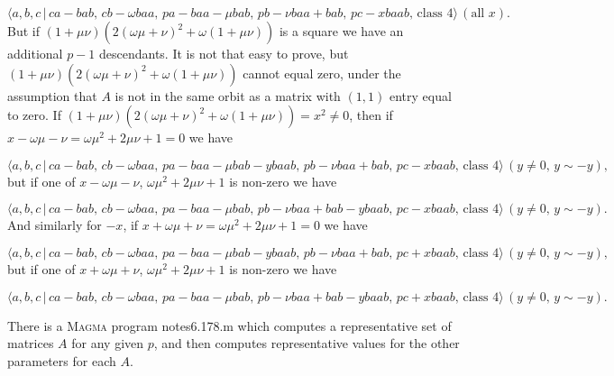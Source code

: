 \documentclass[12pt]{article}
\begin{document}
\[
\langle a,b,c\,|\,ca-bab,\,cb-\omega baa,\,pa-baa-\mu bab,\,pb-\nu
baa+bab,\,pc-xbaab,\,\text{class }4\rangle \,(\text{all }x). 
\]%
But if $\left( 1+\mu \nu \right) \left( 2\left( \omega \mu +\nu \right)
^{2}+\omega (1+\mu \nu )\right) $ is a square we have an additional $p-1$
descendants. It is not that easy to prove, but $\left( 1+\mu \nu \right)
\left( 2\left( \omega \mu +\nu \right) ^{2}+\omega (1+\mu \nu )\right) $
cannot equal zero, under the assumption that $A$ is not in the same orbit as
a matrix with $(1,1)$ entry equal to zero. If $\left( 1+\mu \nu \right)
\left( 2\left( \omega \mu +\nu \right) ^{2}+\omega (1+\mu \nu )\right)
=x^{2}\neq 0$, then if $x-\omega \mu -\nu =\omega \mu ^{2}+2\mu \nu +1=0$ we
have

\[
\langle a,b,c\,|\,ca-bab,\,cb-\omega baa,\,pa-baa-\mu bab-ybaab,\,pb-\nu
baa+bab,\,pc-xbaab,\,\text{class }4\rangle \,(y\neq 0,\,y\sim -y),
\]%
but if one of $x-\omega \mu -\nu $, $\omega \mu ^{2}+2\mu \nu +1$ is
non-zero we have

\[
\langle a,b,c\,|\,ca-bab,\,cb-\omega baa,\,pa-baa-\mu bab,\,pb-\nu
baa+bab-ybaab,\,pc-xbaab,\,\text{class }4\rangle \,(y\neq 0,\,y\sim -y).
\]%
And similarly for $-x$, if $x+\omega \mu +\nu =\omega \mu ^{2}+2\mu \nu +1=0$
we have

\[
\langle a,b,c\,|\,ca-bab,\,cb-\omega baa,\,pa-baa-\mu bab-ybaab,\,pb-\nu
baa+bab,\,pc+xbaab,\,\text{class }4\rangle \,(y\neq 0,\,y\sim -y),
\]%
but if one of $x+\omega \mu +\nu $, $\omega \mu ^{2}+2\mu \nu +1$ is
non-zero we have

\[
\langle a,b,c\,|\,ca-bab,\,cb-\omega baa,\,pa-baa-\mu bab,\,pb-\nu
baa+bab-ybaab,\,pc+xbaab,\,\text{class }4\rangle \,(y\neq 0,\,y\sim -y).
\]

There is a \textsc{Magma} program notes6.178.m which computes a
representative set of matrices $A$ for any given $p$, and then computes
representative values for the other parameters for each $A$.
\end{document}
